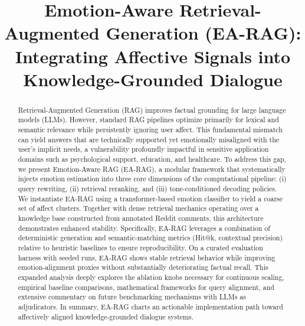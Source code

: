 \documentclass[conference]{IEEEtran}
\begin{document}
\title{Emotion-Aware Retrieval-Augmented Generation (EA-RAG): \\ Integrating Affective Signals into Knowledge-Grounded Dialogue}

\author{
\and
{}
}

\maketitle

\begin{abstract}
Retrieval-Augmented Generation (RAG) improves factual grounding for large language models (LLMs). However, standard RAG pipelines optimize primarily for lexical and semantic relevance while persistently ignoring user affect. This fundamental mismatch can yield answers that are technically supported yet emotionally misaligned with the user's implicit needs, a vulnerability profoundly impactful in sensitive application domains such as psychological support, education, and healthcare. To address this gap, we present Emotion-Aware RAG (EA-RAG), a modular framework that systematically injects emotion estimation into three core dimensions of the computational pipeline: (i) query rewriting, (ii) retrieval reranking, and (iii) tone-conditioned decoding policies. We instantiate EA-RAG using a transformer-based emotion classifier to yield a coarse set of affect clusters. Together with dense retrieval mechanics operating over a knowledge base constructed from annotated Reddit comments, this architecture demonstrates enhanced stability. Specifically, EA-RAG leverages a combination of deterministic generation and semantic-matching metrics (Hit@k, contextual precision) relative to heuristic baselines to ensure reproducibility. On a curated evaluation harness with seeded runs, EA-RAG shows stable retrieval behavior while improving emotion-alignment proxies without substantially deteriorating factual recall. This expanded analysis deeply explores the ablation knobs necessary for continuous scaling, empirical baseline comparisons, mathematical frameworks for query alignment, and extensive commentary on future benchmarking mechanisms with LLMs as adjudicators. In summary, EA-RAG charts an actionable implementation path toward affectively aligned knowledge-grounded dialogue systems.
\end{abstract}
\end{document}
